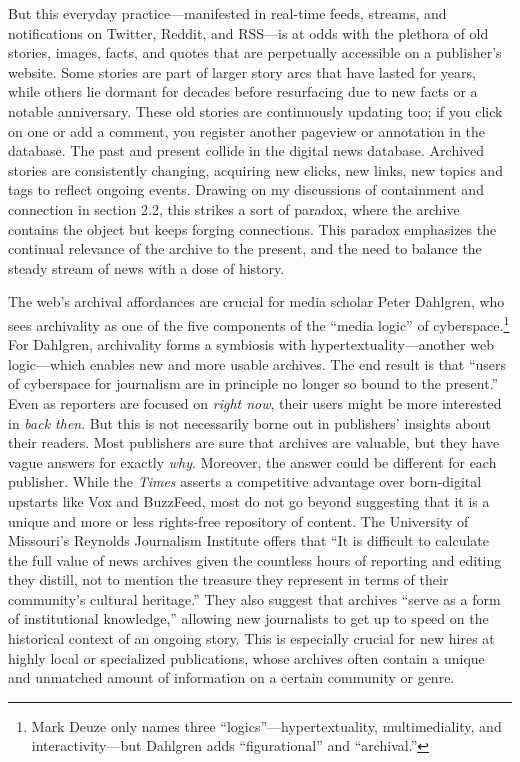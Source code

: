 But this everyday practice---manifested in real-time feeds, streams, and notifications on Twitter, Reddit, and RSS---is at odds with the plethora of old stories, images, facts, and quotes that are perpetually accessible on a publisher's website. Some stories are part of larger story arcs that have lasted for years, while others lie dormant for decades before resurfacing due to new facts or a notable anniversary. These old stories are continuously updating too; if you click on one or add a comment, you register another pageview or annotation in the database. The past and present collide in the digital news database. Archived stories are consistently changing, acquiring new clicks, new links, new topics and tags to reflect ongoing events. Drawing on my discussions of containment and connection in section 2.2, this strikes a sort of paradox, where the archive contains the object but keeps forging connections. This paradox emphasizes the continual relevance of the archive to the present, and the need to balance the steady stream of news with a dose of history.

The web's archival affordances are crucial for media scholar Peter Dahlgren, who sees archivality as one of the five components of the ``media logic'' of cyberspace.\footnote{Mark Deuze only names three ``logics''---hypertextuality, multimediality, and interactivity---but Dahlgren adds ``figurational'' and ``archival.''} For Dahlgren, archivality forms a symbiosis with hypertextuality---another web logic---which enables new and more usable archives. The end result is that ``users of cyberspace for journalism are in principle no longer so bound to the present.''\autocite[66]{dahlgren_media_1996} Even as reporters are focused on \emph{right now}, their users might be more interested in \emph{back then}. But this is not necessarily borne out in publishers' insights about their readers. Most publishers are sure that archives are valuable, but they have vague answers for exactly \emph{why}. Moreover, the answer could be different for each publisher. While the \emph{Times} asserts a competitive advantage over born-digital upstarts like Vox and BuzzFeed, most do not go beyond suggesting that it is a unique and more or less rights-free repository of content. The University of Missouri's Reynolds Journalism Institute offers that ``It is difficult to calculate the full value of news archives given the countless hours of reporting and editing they distill, not to mention the treasure they represent in terms of their community's cultural heritage.''\autocite{mccain_saving_2014} They also suggest that archives ``serve as a form of institutional knowledge,'' allowing new journalists to get up to speed on the historical context of an ongoing story. This is especially crucial for new hires at highly local or specialized publications, whose archives often contain a unique and unmatched amount of information on a certain community or genre.

